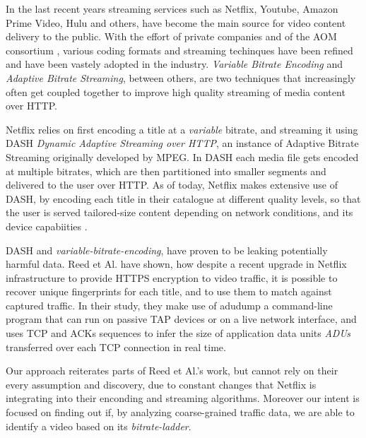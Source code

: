
In the last recent years streaming services such as Netflix, Youtube, Amazon
Prime Video, Hulu and others, have become the main source for video content
delivery to the public. With the effort of private companies and of the AOM
consortium \cite{aom}, various coding formats and streaming techinques have
been refined and have been vastely adopted in the industry.  \emph{Variable
Bitrate Encoding} and \emph{Adaptive Bitrate Streaming}, between others, are
two techniques that increasingly often get coupled together to improve high
quality streaming of media content over HTTP.

Netflix relies on first encoding a title at a \emph{variable} bitrate, and
streaming it using DASH \textit{Dynamic Adaptive Streaming over HTTP}, an
instance of Adaptive Bitrate Streaming originally developed by MPEG. In DASH
each media file gets encoded at multiple bitrates, which are then partitioned
into smaller segments and delivered to the user over HTTP. As of today, Netflix
makes extensive use of DASH, by encoding each title in their catalogue at
different quality levels, so that the user is served tailored-size content
depending on network conditions, and its device capabiities
\cite{per-title-encoding}.

DASH and \emph{variable-bitrate-encoding}, have proven to be leaking
potentially harmful data. Reed et Al. \cite{netflix-real-time} have shown, how
despite a recent upgrade in Netflix infrastructure to provide HTTPS encryption
to video traffic, it is possible to recover unique fingerprints for each title,
and to use them to match against captured traffic. In their study, they make
use of adudump \cite{adudump} a command-line program that can run on passive
TAP devices \cite{tap} or on a live network interface, and uses TCP and ACKs
sequences to infer the size of application data units \emph{ADUs} transferred
over each TCP connection in real time.

Our approach reiterates parts of Reed et Al.'s work, but cannot rely on their
every assumption and discovery, due to constant changes that Netflix is
integrating into their enconding and streaming algorithms. Moreover our intent
is focused on finding out if, by analyzing coarse-grained traffic data, we are
able to identify a video based on its \emph{bitrate-ladder}.

